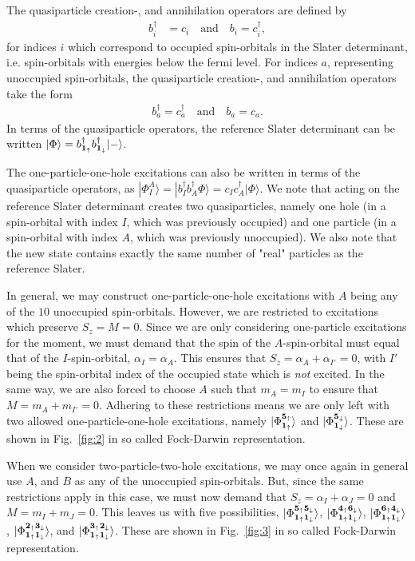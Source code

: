 \documentclass[a4paper]{article}
\newcommand{\fig}[1]{Fig.\ \ref{fig:#1}}
\renewcommand{\u}[1]{{\bf #1}_\uparrow}
\renewcommand{\d}[1]{{\bf #1}_\downarrow}
\newcommand{\boud}{b_{\u{1}}^\dagger}
\newcommand{\bodd}{b_{\d{1}}^\dagger}
\begin{document}
The quasiparticle creation-, and annihilation operators are defined by
\begin{align}
b^\dagger_i &= c_i \ \ \ \text{ and } \ \ \ b_i = c_i^\dagger,
\end{align}
for indices $i$ which correspond to occupied spin-orbitals in the Slater determinant, i.e. spin-orbitals with energies below the fermi level. For indices $a$, representing unoccupied spin-orbitals, the quasiparticle creation-, and annihilation operators take the form
\begin{align}
b^\dagger_a = c^\dagger_a \ \ \ \text{ and } \ \ \ b_a = c_a.
\end{align}
In terms of the quasiparticle operators, the reference Slater determinant can be written $|\Phi\rangle = \boud\bodd|-\rangle$.

The one-particle-one-hole excitations can also be written in terms of the quasiparticle operators, as $|\Phi^A_I\rangle=|b_I^\dagger b_A^\dagger\Phi\rangle = c_I c_A^\dagger |\Phi\rangle$. We note that acting on the reference Slater determinant creates two quasiparticles, namely one hole (in a spin-orbital with index $I$, which was previously occupied) and one particle (in a spin-orbital with index $A$, which was previously unoccupied). We also note that the new state contains exactly the same number of "real" particles as the reference Slater.

In general, we may construct one-particle-one-hole excitations with $A$ being any of the $10$ unoccupied spin-orbitals. However, we are restricted to excitations which preserve $S_z=M=0$. Since we are only considering one-particle excitations for the moment, we must demand that the spin of the $A$-spin-orbital must equal that of the $I$-spin-orbital, $\alpha_I=\alpha_A$. This ensures that $S_z=\alpha_A+\alpha_{I'}=0$, with $I'$ being the spin-orbital index of the occupied state which is \emph{not} excited. In the same way, we are also forced to choose $A$ such that $m_A=m_I$ to ensure that $M=m_A+m_{I'}=0$. Adhering to these restrictions means we are only left with two allowed one-particle-one-hole excitations, namely $|\Phi^{\u{5}}_{\u{1}}\rangle$ and $|\Phi^{\d{5}}_{\d{1}}\rangle$. These are shown in \fig{2} in so called Fock-Darwin representation.

When we consider two-particle-two-hole excitations, we may once again in general use $A$, and $B$ as any of the unoccupied spin-orbitals. But, since the same restrictions apply in this case, we must now demand that $S_z=\alpha_I + \alpha_J=0$ and $M=m_I+m_J=0$. This leaves us with five possibilities,
$|\Phi^{\u{5}\d{5}}_{\u{1}\d{1}}\rangle$, $|\Phi^{\u{4}\d{6}}_{\u{1}\d{1}}\rangle$, $|\Phi^{\u{6}\d{4}}_{\u{1}\d{1}}\rangle$, $|\Phi^{\u{2}\d{3}}_{\u{1}\d{1}}\rangle$, and $|\Phi^{\u{3}\d{2}}_{\u{1}\d{1}}\rangle$. These are shown in \fig{3} in so called Fock-Darwin representation.
\end{document}
